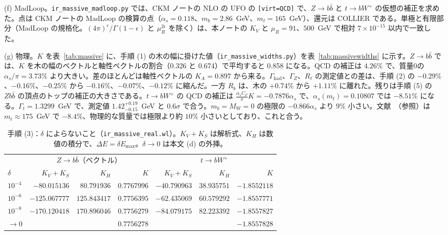 \documentclass[a4paper,10pt]{ltjsarticle}
\begin{document}
(f) MadLoop。\texttt{ir\_massive\_madloop.py} では、CKM ノートの NLO の UFO の \texttt{[virt=QCD]} で、$Z\to b\bar b$ と $t\to bW^+$ の仮想の補正を求めた。点は CKM ノートの MadLoop の検算の点（$\alpha_s=0.118$、$m_b=2.86$~GeV、$m_t=165$~GeV）、還元は COLLIER である。単極と有限部分（MadLoop の規格化。$(4\pi)^\epsilon/\Gamma(1-\epsilon)$ と $\mu_R^{2\epsilon}$ を除く）は、本ノートの $K_V$ と $\mu_R=91$、$500$~GeV で相対 $7\times10^{-15}$ 以内で一致した。

(g) 物理。$K$ を表~\ref{tab:massive} に、手順 (1) の木の幅に掛けた値（\texttt{ir\_massive\_widths.py}）を表~\ref{tab:massivewidths} に示す。$Z\to b\bar b$ では、$K$ を木の幅のベクトルと軸性ベクトルの割合（0.326 と 0.674）で平均すると 0.858 になる。QCD の補正は $4.26\%$ で、質量0の $\alpha_s/\pi=3.73\%$ より大きい。差のほとんどは軸性ベクトルの $K_A=0.897$ から来る。$\Gamma_{\mathrm{had}}$、$\Gamma_Z$、$R_\ell$ の測定値との差は、手順 (2) の $-0.29\%$、$-0.16\%$、$-0.25\%$ から $-0.16\%$、$-0.07\%$、$-0.12\%$ に縮んだ。一方 $R_b$ は、木の $+0.74\%$ から $+1.11\%$ に離れた。残りは手順 (5) の $Zb\bar b$ の頂点のトップの補正の大きさである。$t\to bW^+$ の QCD の補正は $\frac{\alpha_sC_F}\pi K=-0.7876\alpha_s$ で、$\alpha_s(m_t)=0.10807$ では $-8.51\%$ になる。$\Gamma_t=1.3299$~GeV で、測定値 $1.42^{+0.19}_{-0.15}$~GeV と $0.6\sigma$ で合う。$m_b=M_W=0$ の極限の $-0.866\alpha_s$ より $9\%$ 小さい。文献~\cite{cm98}（参照）は $m_t\approx175$~GeV で $-8.4\%$、物理的な質量では極限より約 $10\%$ 小さいとしており、これと合う。

\begin{table}[tbp]
\centering\small
\caption{手順 (3)：$\delta$ によらないこと（\texttt{ir\_massive\_real.wl}）。$K_V+K_S$ は解析式、$K_H$ は数値の積分で、$\Delta E=\delta E_{\max}$。$\delta\to0$ は本文 (d) の外挿。}
\label{tab:massdelta}
\begin{tabular}{lrrrrrr}
\toprule
 & \multicolumn{3}{c}{$Z\to b\bar b$（ベクトル）} & \multicolumn{3}{c}{$t\to bW^+$} \\
$\delta$ & $K_V+K_S$ & $K_H$ & $K$ & $K_V+K_S$ & $K_H$ & $K$ \\
\midrule
$10^{-4}$ & $-80.015136$ & $80.791936$ & $0.7767996$ & $-40.790963$ & $38.935751$ & $-1.8552118$ \\
$10^{-6}$ & $-125.067777$ & $125.843417$ & $0.7756395$ & $-62.435069$ & $60.579292$ & $-1.8557771$ \\
$10^{-8}$ & $-170.120418$ & $170.896046$ & $0.7756279$ & $-84.079175$ & $82.223392$ & $-1.8557827$ \\
$\to0$ & & & $0.7756278$ & & & $-1.8557828$ \\
\bottomrule
\end{tabular}
\end{table}
\end{document}
